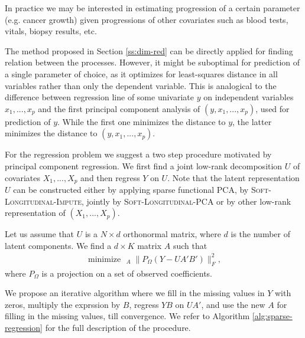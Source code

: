 \documentclass[preprint]{imsart}
\numberwithin{equation}{section}
\theoremstyle{plain}
\DeclareMathOperator*{\argmin}{arg\,min}
\DeclareMathOperator*{\minimize}{minimize\ \ }
\begin{document}
In practice we may be interested in estimating progression of a certain parameter (e.g. cancer growth) given progressions of other covariates such as blood tests, vitals, biopsy results, etc.

The method proposed in Section \ref{ss:dim-red} can be directly applied for finding relation between the processes. However, it might be suboptimal for prediction of a single parameter of choice, as it optimizes for least-squares distance in all variables rather than only the dependent variable. This is analogical to the difference between regression line of some univariate $y$ on independent variables $x_1,...,x_p$ and the first principal component analysis of $(y,x_1,...,x_p)$, used for prediction of $y$. While the first one minimizes the distance to $y$, the latter minimizes the distance to $(y,x_1,...,x_p)$.


For the regression problem we suggest a two step procedure motivated by principal component regression. We first find a joint low-rank decomposition $U$ of covariates $X_1,...,X_p$ and then regress $Y$ on $U$. Note that the latent representation $U$ can be constructed either by applying sparse functional PCA, by \textsc{Soft-Longitudinal-Impute}, jointly by \textsc{Soft-Longitudinal-PCA} or by other low-rank representation of $(X_1,...,X_p)$.

Let us assume that $U$ is a $N \times d$ orthonormal matrix, where $d$ is the number of latent components. We find a $d \times K$ matrix $A$ such that
\begin{align}\label{eq:pcr}
\minimize_A \|P_\Omega(Y - UA'B')\|_F^2,
\end{align}
where $P_\Omega$ is a projection on a set of observed coefficients.

We propose an iterative algorithm where we fill in the missing values in $Y$ with zeros, multiply the exprssion by $B$, regress $YB$ on $UA'$, and use the new $A$ for filling in the missing values, till convergence. We refer to Algorithm \ref{alg:sparse-regression} for the full description of the procedure.


\end{document}
